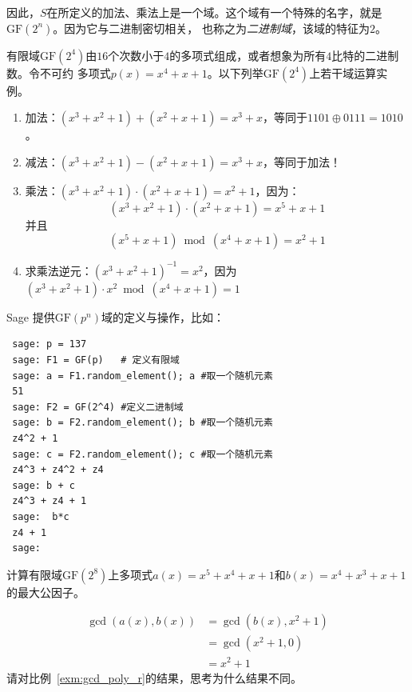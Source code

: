  因此，$S$在所定义的加法、乘法上是一个域。这个域有一个特殊的名字，就是$\mathrm{GF}(2^n)$。因为它与二进制密切相关，
 也称之为\emph{二进制域}，该域的特征为$2$。
 \begin{example}
 有限域$\mathrm{GF}(2^4)$由$16$个次数小于$4$的多项式组成，或者想象为所有$4$比特的二进制数。令不可约
 多项式$p(x) = x^4 + x + 1$。以下列举$\mathrm{GF}(2^4)$上若干域运算实例。
 \begin{enumerate}
 \item 加法：$(x^3 + x^2 + 1) + (x^2 + x + 1) = x^3 + x$，等同于$1101 \oplus 0111 = 1010 $。
 
 \item 减法：$(x^3 + x^2 + 1) - (x^2 + x + 1) = x^3 + x$，等同于加法！
 
 \item 乘法：$(x^3 + x^2 + 1) \cdot (x^2 + x + 1) = x^2 + 1$，因为：
 \[(x^3 + x^2 + 1) \cdot (x^2 + x + 1) = x^5 + x + 1\]
 并且
 \[(x^5 + x + 1) \bmod (x^4 + x + 1) = x^2 + 1 \]
 
 \item 求乘法逆元：$(x^3 + x^2 + 1) ^{-1} = x^2$，因为$(x^3 + x^2 + 1) \cdot x^2 \bmod (x^4 + x + 1) = 1$
 \end{enumerate}
 \end{example}
 
 \begin{example}
	 Sage 提供$\mathrm{GF}(p^n)$域的定义与操作，比如：
 \begin{lstlisting}
 sage: p = 137
 sage: F1 = GF(p)   # 定义有限域
 sage: a = F1.random_element(); a #取一个随机元素
 51
 sage: F2 = GF(2^4) #定义二进制域
 sage: b = F2.random_element(); b #取一个随机元素
 z4^2 + 1
 sage: c = F2.random_element(); c #取一个随机元素
 z4^3 + z4^2 + z4
 sage: b + c
 z4^3 + z4 + 1
 sage:  b*c
 z4 + 1
 sage: 
 \end{lstlisting}
 \end{example}
 
 \begin{example}
 \label{exm:gcd_poly_gf}
 计算有限域$\mathrm{GF}(2^8)$上多项式$a(x) = x^5 + x^4 + x + 1$和$b(x) = x^4 + x^3 + x + 1$的最大公因子。
 
 \begin{align*}
	 \gcd(a(x), b(x)) &= \gcd(b(x), x^2 + 1)\\
	                               &= \gcd(x^2 + 1, 0)\\
                               &= x^2 + 1
 \end{align*}
 请对比例~\ref{exm:gcd_poly_r}的结果，思考为什么结果不同。
 \end{example}
